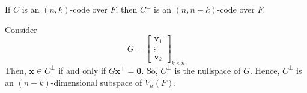 \begin{Theorem}{}{}
    If $ C $ is an $ (n,k) $-code over $ F $, then $ C^{\perp} $ is an
    $ (n,n-k) $-code over $ F $.
\end{Theorem}

\begin{Proof}{}{}
    Consider
    \[ G=\begin{bmatrix}
            \symbf{v}_1 \\
            \vdots      \\
            \symbf{v}_k
        \end{bmatrix}_{k\times n} \]
    Then, $ \symbf{x}\in C^{\perp} $ if and only if $ G \symbf{x}^{\top}=\symbf{0} $. So, $ C^{\perp} $
    is the nullspace of $ G $. Hence, $ C^{\perp} $ is an
    $ (n-k) $-dimensional subspace of $ V_n(F) $.
\end{Proof}
